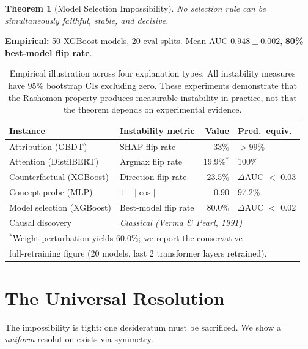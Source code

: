 \documentclass{article}
\newtheorem{theorem}{Theorem}
\newcommand{\GBDT}{\textsc{GBDT}}
\begin{document}
\begin{theorem}[Model Selection Impossibility]
No selection rule can be simultaneously faithful, stable, and decisive.
\end{theorem}

\textbf{Empirical:} 50 XGBoost models, 20 eval splits. Mean AUC $0.948 \pm 0.002$, \textbf{80\% best-model flip rate}.

\begin{table}[t]
\centering
\caption{Empirical illustration across four explanation types. All instability measures have 95\% bootstrap CIs excluding zero. These experiments demonstrate that the Rashomon property produces measurable instability in practice, not that the theorem depends on experimental evidence.}
\label{tab:cross-instance}
\small
\begin{tabular}{llrl}
\toprule
Instance & Instability metric & Value & Pred.\ equiv. \\
\midrule
Attribution (\GBDT{}) & SHAP flip rate & 33\% & $>$99\% \\
Attention (DistilBERT) & Argmax flip rate & 19.9\%$^{*}$ & 100\% \\
Counterfactual (XGBoost) & Direction flip rate & 23.5\% & $\Delta$AUC $<$ 0.03 \\
Concept probe (MLP) & $1 - |\cos|$ & 0.90 & 97.2\% \\
Model selection (XGBoost) & Best-model flip rate & 80.0\% & $\Delta$AUC $<$ 0.02 \\
Causal discovery & \multicolumn{3}{l}{\textit{Classical (Verma \& Pearl, 1991)}} \\
\bottomrule
\multicolumn{4}{l}{$^{*}$Weight perturbation yields 60.0\%; we report the conservative} \\
\multicolumn{4}{l}{\quad full-retraining figure (20 models, last 2 transformer layers retrained).} \\
\end{tabular}
\end{table}

\section{The Universal Resolution}
\label{sec:resolution}

The impossibility is tight: one desideratum must be sacrificed.  We show a \emph{uniform} resolution exists via symmetry.
\end{document}
